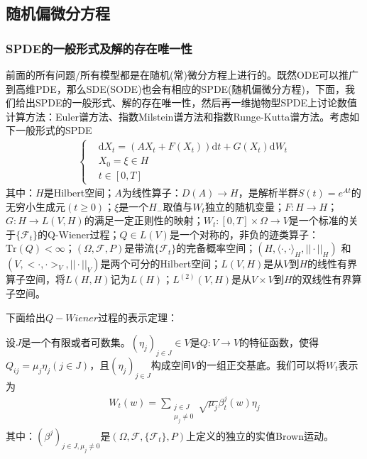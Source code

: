     \subsection{随机偏微分方程}
        \subsubsection{SPDE的一般形式及解的存在唯一性}
            \par
            前面的所有问题/所有模型都是在随机(常)微分方程上进行的。既然ODE可以推广到高维PDE，那么SDE(SODE)也会有相应的SPDE(随机偏微分方程)，下面，我们给出SPDE的一般形式、解的存在唯一性，然后再一维抛物型SPDE上讨论数值计算方法：Euler谱方法、指数Milstein谱方法和指数Runge-Kutta谱方法。考虑如下一般形式的SPDE
            \begin{align*}
                \left\{
                    \begin{aligned}
                    &\mathrm{d}X_t = (AX_t +F(X_t))\mathrm{d}t + G(X_t)\mathrm{d}W_t\\
                    &X_0 = \xi \in H\\
                    &t\in [0,T]
                    \end{aligned}
                \right.
            \end{align*}
            其中：$H$是Hilbert空间；$A$为线性算子：$D(A)\rightarrow H$，是解析半群$S(t) = e^{At}$的无穷小生成元$(t \geqslant 0)$；$\xi$是一个$H_-$取值与$W_t$独立的随机变量；$F:H\rightarrow H$；$G:H\rightarrow L(V,H)$的满足一定正则性的映射；$W_t:[0,T]\times \Omega \rightarrow V$是一个标准的关于$\{\mathcal{F}_t\}$的Q-Wiener过程；$Q\in L(V)$是一个对称的，非负的迹类算子：$\mathrm{Tr}(Q) < \infty$；$(\Omega,\mathcal{F},P)$是带流$\{\mathcal{F}_t\}$的完备概率空间；$(H,\langle\cdot ,\cdot\rangle_H,||\cdot||_H)$ 和$(V,\bigl<\cdot ,\cdot\bigr>_V,||\cdot||_V)$是两个可分的Hilbert空间；$L(V,H)$是从$V$到$H$的线性有界算子空间，将$L(H,H)$记为$L(H)$；$L^{(2)}(V,H)$是从$V\times V$到$H$的双线性有界算子空间。
            \par
            下面给出$Q-Wiener$过程的表示定理：
            \begin{theorem}[表示定理]
                设$J$是一个有限或者可数集。$(\eta_j)_{j\in J} \in V$是$Q:V\rightarrow V$的特征函数，使得$Q_{ij} = \mu_j\eta_j(j \in J)$，且$(\eta_j)_{j\in J} $构成空间$V$的一组正交基底。我们可以将$W_t$表示为
                \begin{align*}
                    W_t(w) = \sum_{\substack{j\in J \\ \mu _j \neq 0}} \sqrt{\mu_j}\beta_t^j(w)\eta_j
                \end{align*}
                其中：$(\beta^j)_{j\in J,\mu_j \neq 0}$是$(\Omega,\mathcal{F},\{\mathcal{F}_t\},P)$上定义的独立的实值Brown运动。
            \end{theorem}
